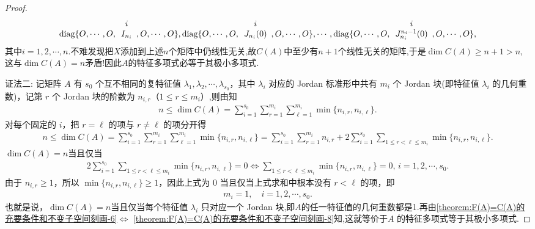 \documentclass[../../main.tex]{subfiles}%
\begin{document}
\begin{proof}
\begin{align*}
\operatorname{diag}\{O, \cdots, O, \begin{array}[b]{c} i \\ I_{n_i} \end{array}, O, \cdots, O\},
\operatorname{diag}\{O, \cdots, O, \begin{array}[b]{c} i \\ J_{n_i}(0) \end{array}, O, \cdots, O\},\cdots,
\operatorname{diag}\{O, \cdots, O, \begin{array}[b]{c} i \\ J_{n_i}^{n_i-1}(0) \end{array}, O, \cdots, O\},
\end{align*}
其中$i=1,2,\cdots,n$.不难发现把$X$添加到上述$n$个矩阵中仍线性无关,故$C(A)$中至少有$n+1$个线性无关的矩阵,于是$\dim C(A)\geqslant n+1>n$,这与$\dim C(A)=n$矛盾!因此$A$的特征多项式必等于其极小多项式.

{\color{blue}证法二:}
记矩阵 \(A\) 有 \(s_0\) 个互不相同的复特征值 \(\lambda_1, \lambda_2, \cdots, \lambda_{s_0}\)，其中 \(\lambda_i\) 对应的 Jordan 标准形中共有 \(m_i\) 个 Jordan 块(即特征值 \(\lambda_i\) 的几何重数)，记第 \(r\) 个 Jordan 块的阶数为 \(n_{i,r}\)（\(1 \leqslant r \leqslant m_i\)）,则由知
\begin{align*}
n\leqslant \dim C(A) = \sum_{i = 1}^{s_0}\sum_{r = 1}^{m_i}\sum_{\ell = 1}^{m_i}\min\{n_{i,r}, n_{i,\ell}\}.
\end{align*}
对每个固定的 $i$，把 $r=\ell$ 的项与 $r\ne \ell$ 的项分开得
\begin{align*}
n\leqslant \dim C(A) = \sum_{i = 1}^{s_0}\sum_{r = 1}^{m_i}\sum_{\ell = 1}^{m_i}\min\{n_{i,r}, n_{i,\ell}\}
=
\sum_{i = 1}^{s_0}\sum\limits_{r=1}^{m_i} n_{i,r}
+
2\sum_{i = 1}^{s_0}\sum\limits_{1\le r<\ell\le m_i}
\min\{n_{i,r},n_{i,\ell}\}.
\end{align*}
$\dim C(A)=n$当且仅当
\begin{align*}
2\sum_{i = 1}^{s_0}\sum\limits_{1\le r<\ell\le m_i}
\min\{n_{i,r},n_{i,\ell}\}=0\iff \sum\limits_{1\le r<\ell\le m_i}
\min\{n_{i,r},n_{i,\ell}\}=0,\,i=1,2,\cdots,s_0.
\end{align*}
由于 $n_{i,r}\geqslant 1$，所以 $\min\{n_{i,r},n_{i,\ell}\}\geqslant 1$，因此上式为 $0$ 当且仅当上式求和中根本没有 $r<\ell$ 的项，即
\begin{align*}
m_i=1,\quad i=1,2,\cdots,s_0.
\end{align*}
也就是说，$\dim C(A)=n$当且仅当每个特征值 $\lambda_i$ 只对应一个 Jordan 块,即$A$的任一特征值的几何重数都是1.再由\ref{theorem:F(A)=C(A)的充要条件和不变子空间刻画-6}$\Leftrightarrow$ \ref{theorem:F(A)=C(A)的充要条件和不变子空间刻画-8}知,这就等价于$A$ 的特征多项式等于其极小多项式.


\end{proof}
\end{document}

